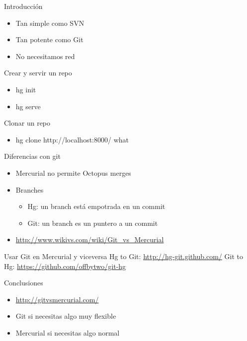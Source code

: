 \documentclass[spanish]{beamer}
\begin{document}
        \begin{frame}{Introducción}
            \begin{itemize}
                \item Tan simple como SVN
                \item Tan potente como Git
                \item No necesitamos red
            \end{itemize}
        \end{frame}
        
        
        \begin{frame}{Crear y servir un repo}
            \begin{itemize}
                \item hg init
                \item hg serve
            \end{itemize}
        \end{frame}
        
        
        \begin{frame}{Clonar un repo}
            \begin{itemize}
                \item hg clone http://localhost:8000/ what      
            \end{itemize}
        \end{frame}
        
        
        \begin{frame}{Diferencias con git}
            \begin{itemize}
                \item Mercurial no permite Octopus merges
                \item Branches
                \begin{itemize}
                    \item Hg: un branch está empotrada en un commit
                    \item Git: un branch es un puntero a un commit
                \end{itemize}
                \item \url{http://www.wikivs.com/wiki/Git_vs_Mercurial}
            \end{itemize}
        \end{frame}
        
        
        
               
        \begin{frame}{Usar Git en Mercurial y viceversa} 
        Hg to Git: \url{http://hg-git.github.com/}
        Git to Hg: \url{https://github.com/offbytwo/git-hg}
        \end{frame}
	\begin{frame}{Conclusiones}
	    \begin{itemize}
	    \item \url{http://gitvsmercurial.com/}
	    \item Git si necesitas algo muy flexible
	    \item Mercurial si necesitas algo normal
        \end{itemize}
        \end{frame}
       
\end{document}
